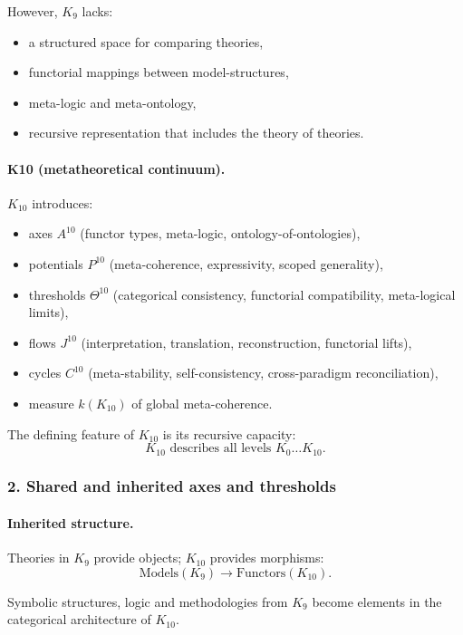 However, $K_9$ lacks:
\begin{itemize}
  \item a structured space for comparing theories,
  \item functorial mappings between model-structures,
  \item meta-logic and meta-ontology,
  \item recursive representation that includes the theory of theories.
\end{itemize}

\paragraph{K10 (metatheoretical continuum).}
$K_{10}$ introduces:
\begin{itemize}
  \item axes $A^{10}$ (functor types, meta-logic, ontology-of-ontologies),
  \item potentials $P^{10}$ (meta-coherence, expressivity, scoped generality),
  \item thresholds $\Theta^{10}$ (categorical consistency, functorial
        compatibility, meta-logical limits),
  \item flows $J^{10}$ (interpretation, translation, reconstruction,
        functorial lifts),
  \item cycles $C^{10}$ (meta-stability, self-consistency,
        cross-paradigm reconciliation),
  \item measure $k(K_{10})$ of global meta-coherence.
\end{itemize}

The defining feature of $K_{10}$ is its recursive capacity:
\[
K_{10} \text{ describes all levels } K_0\dots K_{10}.
\]

\subsubsection{2. Shared and inherited axes and thresholds}

\paragraph{Inherited structure.}
Theories in $K_9$ provide objects; $K_{10}$ provides morphisms:
\[
\text{Models}(K_9) \rightarrow \text{Functors}(K_{10}).
\]

Symbolic structures, logic and methodologies from $K_9$ become elements in
the categorical architecture of $K_{10}$.

